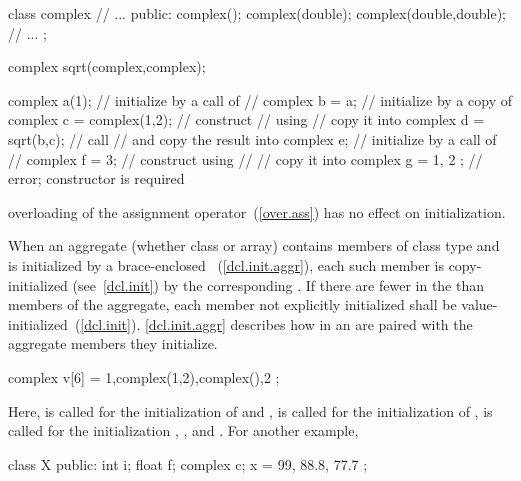 \begin{codeblock}
class complex {
    // ...
public:
    complex();
    complex(double);
    complex(double,double);
    // ...
};

complex sqrt(complex,complex);

	complex a(1);			// initialize by a call of
					// 
	complex b = a;			// initialize by a copy of 
	complex c = complex(1,2);       // construct 
					// using 
					// copy it into 
	complex d = sqrt(b,c);		// call 
					// and copy the result into 
	complex e;			// initialize by a call of
					// 
	complex f = 3;			// construct  using
					// 
					// copy it into 
	complex g = { 1, 2 };		// error; constructor is required
\end{codeblock}
\exitexampleb
\enternote
{}%
overloading of the assignment operator~(\ref{over.ass})
has no effect on initialization.
\exitnote

\pnum
{}%
%
When an aggregate (whether class or array) contains members of class type
and is initialized by a brace-enclosed
~(\ref{dcl.init.aggr}), each such member is
copy-initialized (see~\ref{dcl.init}) by the corresponding
. If there are fewer
 in the  than
members of the aggregate, each member not explicitly initialized shall be
value-initialized~(\ref{dcl.init}).
\enternote
\ref{dcl.init.aggr} describes how 
in an  are paired with the aggregate members
they initialize.
\exitnote
\enterexample

\begin{codeblock}
complex v[6] = { 1,complex(1,2),complex(),2 };
\end{codeblock}

Here,
is called for the initialization of
and
,
is called for the initialization of
,
is called for the initialization
,
,
and
.
For another example,

\begin{codeblock}
class X {
public:
	int i;
	float f;
	complex c;
} x = { 99, 88.8, 77.7 };
\end{codeblock}

